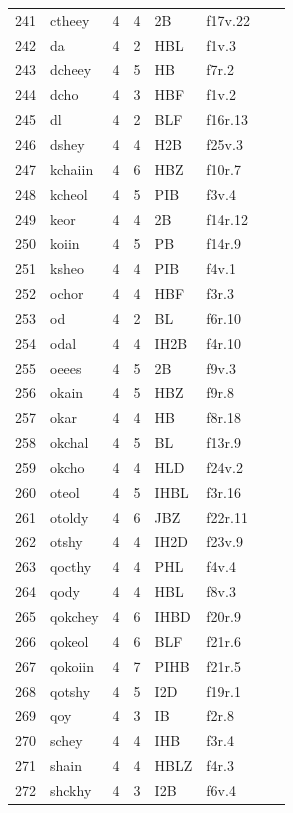 \documentclass[11pt,a4paper]{article}
\begin{document}
\begin{landscape}
\begin{longtable}{@{}r>{\ttfamily}lrrl>{\ttfamily}l>{\raggedright\arraybackslash}p{80mm}>{\raggedright\arraybackslash}p{36mm}@{}}
241 & ctheey & 4 & 4 & 2B & f17v.22 &  & \\
242 & da & 4 & 2 & HBL & f1v.3 &  & \\
243 & dcheey & 4 & 5 & HB & f7r.2 &  & \\
244 & dcho & 4 & 3 & HBF & f1v.2 &  & \\
245 & dl & 4 & 2 & BLF & f16r.13 &  & \\
246 & dshey & 4 & 4 & H2B & f25v.3 &  & \\
247 & kchaiin & 4 & 6 & HBZ & f10r.7 &  & \\
248 & kcheol & 4 & 5 & PIB & f3v.4 &  & \\
249 & keor & 4 & 4 & 2B & f14r.12 &  & \\
250 & koiin & 4 & 5 & PB & f14r.9 &  & \\
251 & ksheo & 4 & 4 & PIB & f4v.1 &  & \\
252 & ochor & 4 & 4 & HBF & f3r.3 &  & \\
253 & od & 4 & 2 & BL & f6r.10 &  & \\
254 & odal & 4 & 4 & IH2B & f4r.10 &  & \\
255 & oeees & 4 & 5 & 2B & f9v.3 &  & \\
256 & okain & 4 & 5 & HBZ & f9r.8 &  & \\
257 & okar & 4 & 4 & HB & f8r.18 &  & \\
258 & okchal & 4 & 5 & BL & f13r.9 &  & \\
259 & okcho & 4 & 4 & HLD & f24v.2 &  & \\
260 & oteol & 4 & 5 & IHBL & f3r.16 &  & \\
261 & otoldy & 4 & 6 & JBZ & f22r.11 &  & \\
262 & otshy & 4 & 4 & IH2D & f23v.9 &  & \\
263 & qocthy & 4 & 4 & PHL & f4v.4 &  & \\
264 & qody & 4 & 4 & HBL & f8v.3 &  & \\
265 & qokchey & 4 & 6 & IHBD & f20r.9 &  & \\
266 & qokeol & 4 & 6 & BLF & f21r.6 &  & \\
267 & qokoiin & 4 & 7 & PIHB & f21r.5 &  & \\
268 & qotshy & 4 & 5 & I2D & f19r.1 &  & \\
269 & qoy & 4 & 3 & IB & f2r.8 &  & \\
270 & schey & 4 & 4 & IHB & f3r.4 &  & \\
271 & shain & 4 & 4 & HBLZ & f4r.3 &  & \\
272 & shckhy & 4 & 3 & I2B & f6v.4 &  & \\

\end{longtable}
\end{landscape}
\end{document}
